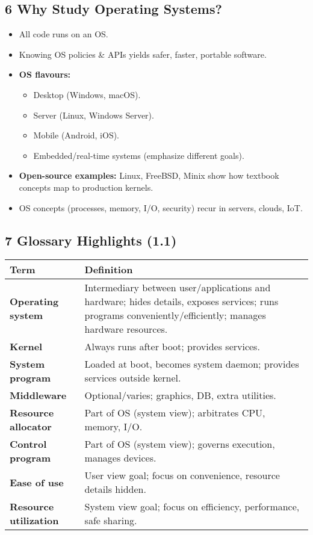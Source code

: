 \documentclass{article}
\begin{document}
\subsection*{6 Why Study Operating Systems?}
\begin{itemize}
    \item All code runs on an OS.
    \item Knowing OS policies \& APIs yields safer, faster, portable software.
    \item \textbf{OS flavours:}
    \begin{itemize}
        \item Desktop (Windows, macOS).
        \item Server (Linux, Windows Server).
        \item Mobile (Android, iOS).
        \item Embedded/real-time systems (emphasize different goals).
    \end{itemize}
    \item \textbf{Open-source examples:} Linux, FreeBSD, Minix show how textbook concepts map to production kernels.
    \item OS concepts (processes, memory, I/O, security) recur in servers, clouds, IoT.
\end{itemize}

\subsection*{7 Glossary Highlights (1.1)}
\centering
\begin{tabular}{>{\raggedright}p{} >{\raggedright\arraybackslash}p{}}
\toprule
\textbf{Term} & \textbf{Definition} \\
\midrule
\textbf{Operating system} & Intermediary between user/applications and hardware; hides details, exposes services; runs programs conveniently/efficiently; manages hardware resources. \\
\textbf{Kernel} & Always runs after boot; provides services. \\
\textbf{System program} & Loaded at boot, becomes system daemon; provides services outside kernel. \\
\textbf{Middleware} & Optional/varies; graphics, DB, extra utilities. \\
\textbf{Resource allocator} & Part of OS (system view); arbitrates CPU, memory, I/O. \\
\textbf{Control program} & Part of OS (system view); governs execution, manages devices. \\
\textbf{Ease of use} & User view goal; focus on convenience, resource details hidden. \\
\textbf{Resource utilization} & System view goal; focus on efficiency, performance, safe sharing. \\
\bottomrule
\end{tabular}
\vspace{\baselineskip}
\end{document}
